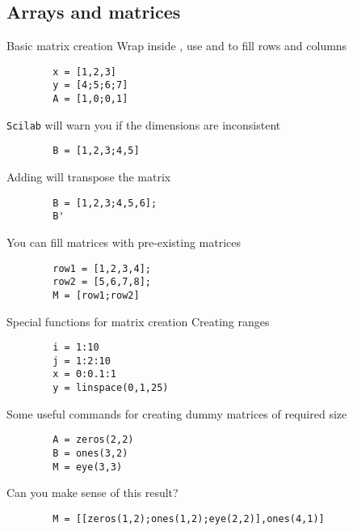 \documentclass[%
    10pt,
    xcolor={dvipsnames},
    handout,
]{beamer}
\newcommand{\inlinecode}[1]{\inlinecodebox{#1}} %
\newcommand{\scilab}{\texttt{Scilab}}
\begin{document}
\subsection{Arrays and matrices}
\begin{frame}[fragile]{Basic matrix creation}
    Wrap inside \inlinecode{[]}, use \inlinecode{,} and \inlinecode{;} to fill rows and columns
    \begin{lstlisting}
        x = [1,2,3]
        y = [4;5;6;7]
        A = [1,0;0,1]
    \end{lstlisting}
    \scilab{} will warn you if the dimensions are inconsistent
    \begin{lstlisting}
        B = [1,2,3;4,5]
    \end{lstlisting}
    Adding \inlinecode{'} will transpose the matrix
    \begin{lstlisting}
        B = [1,2,3;4,5,6];
        B'
    \end{lstlisting}
    You can fill matrices with pre-existing matrices
    \begin{lstlisting}
        row1 = [1,2,3,4];
        row2 = [5,6,7,8];
        M = [row1;row2]
    \end{lstlisting}
\end{frame}

\begin{frame}[fragile]{Special functions for matrix creation}
    Creating ranges
    \begin{lstlisting}
        i = 1:10
        j = 1:2:10
        x = 0:0.1:1
        y = linspace(0,1,25)
    \end{lstlisting}
    Some useful commands for creating dummy matrices of required size
    \begin{lstlisting}
        A = zeros(2,2)
        B = ones(3,2)
        M = eye(3,3)
    \end{lstlisting}
    Can you make sense of this result?
    \begin{lstlisting}
        M = [[zeros(1,2);ones(1,2);eye(2,2)],ones(4,1)]
    \end{lstlisting}
\end{frame}
\end{document}

